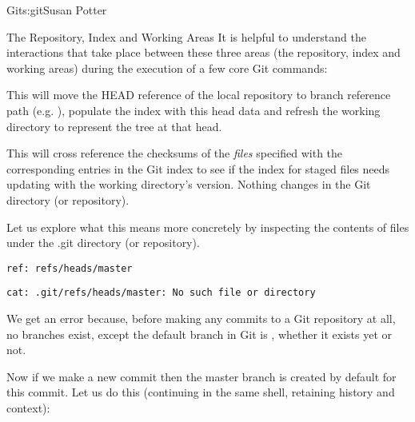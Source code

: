 \begin{aosachapter}{Git}{s:git}{Susan Potter}
\begin{aosasect1}{The Repository, Index and Working Areas}
It is helpful to understand the interactions that take place between these
three areas (the repository, index and working areas) during the execution
of a few core Git commands:

\begin{aosaitemize}
  \item {} \newline
  \small{This will move the HEAD reference of the local repository to branch
  reference path (e.g. ), populate the index with
  this head data and refresh the working directory to represent the tree
  at that head.}
  \item {} \newline
  \small{This will cross reference the checksums of the \emph{files}
  specified with the corresponding entries in the Git index to see if the
  index for staged files needs updating with the working directory's
  version. Nothing changes in the Git directory (or repository).}
\end{aosaitemize}

Let us explore what this means more concretely by inspecting the contents of
files under the .git directory (or repository).

\begin{aosaitemize}
  \item {}
  \item {}
\begin{verbatim}
ref: refs/heads/master
\end{verbatim}
  \item {}
  \item {}
\begin{verbatim}
cat: .git/refs/heads/master: No such file or directory
\end{verbatim}
\end{aosaitemize}

We get an error because, before making any commits to a Git repository at
all, no branches exist, except the default branch in Git is ,
whether it exists yet or not.

Now if we make a new commit then the master branch is created by default for
this commit. Let us do this (continuing in the same shell, retaining
history and context):


\end{aosasect1}
\end{aosachapter}
